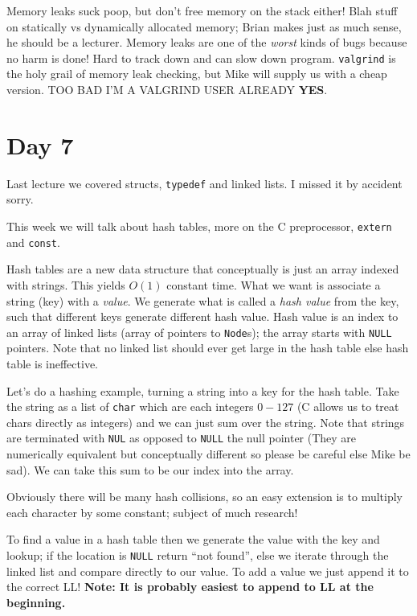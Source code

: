 \documentclass[10pt,landscape, twocolumn]{article}
\begin{document}
Memory leaks suck poop, but don't free memory on the stack either! Blah stuff on statically vs dynamically allocated memory; Brian makes just as much sense, he should be a lecturer. Memory leaks are one of the \emph{worst} kinds of bugs because no harm is done! Hard to track down and can slow down program. \texttt{valgrind} is the holy grail of memory leak checking, but Mike will supply us with a cheap version. TOO BAD I'M A VALGRIND USER ALREADY \textbf{YES}.
\section*{Day 7}

Last lecture we covered structs, \texttt{typedef} and linked lists. I missed it by accident sorry.

This week we will talk about hash tables, more on the C preprocessor, \texttt{extern} and \texttt{const}. 

Hash tables are a new data structure that conceptually is just an array indexed  with strings. This yields $O(1)$ constant time. What we want is associate a string (key) with a \emph{value}. We generate what is called a \emph{hash value} from the key, such that different keys generate different hash value. Hash value is an index to an array of linked lists (array of pointers to \texttt{Node}s); the array starts with \texttt{NULL} pointers. Note that no linked list should ever get large in the hash table else hash table is ineffective.

Let's do a hashing example, turning a string into a key for the hash table. Take the string as a list of \texttt{char} which are each integers $0-127$ (C allows us to treat chars directly as integers) and we can just sum over the string. Note that strings are terminated with \texttt{NUL} as opposed to \texttt{NULL} the null pointer (They are numerically equivalent but conceptually different so please be careful else Mike be sad). We can take this sum to be our index into the array.

Obviously there will be many hash collisions, so an easy extension is to multiply each character by some constant; subject of much research!

To find a value in a hash table then we generate the value with the key and lookup; if the location is \texttt{NULL} return ``not found'', else we iterate through the linked list and compare directly to our value. To add a value we just append it to the correct LL! \textbf{Note: It is probably easiest to append to LL at the beginning.}
\end{document}

